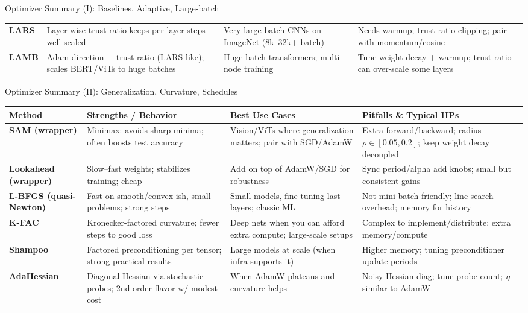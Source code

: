\documentclass{beamer}
\begin{document}
\begin{frame}{Optimizer Summary (I): Baselines, Adaptive, Large-batch}
\begin{tabular}{p{2.8cm} p{4.3cm} p{4.5cm} p{3.5cm}}
\textbf{LARS} &
Layer-wise trust ratio keeps per-layer steps well-scaled &
Very large-batch CNNs on ImageNet (8k–32k+ batch) &
Needs warmup; trust-ratio clipping; pair with momentum/cosine \\

\textbf{LAMB} &
Adam-direction + trust ratio (LARS-like); scales BERT/ViTs to huge batches &
Huge-batch transformers; multi-node training &
Tune weight decay + warmup; trust ratio can over-scale some layers \\
\end{tabular}
\end{frame}

\begin{frame}{Optimizer Summary (II): Generalization, Curvature, Schedules}
\scriptsize
\setlength{\tabcolsep}{3pt}
\renewcommand{\arraystretch}{1.25}
\begin{tabular}{p{2.8cm} p{4.3cm} p{4.5cm} p{3.5cm}}
\textbf{Method} & \textbf{Strengths / Behavior} & \textbf{Best Use Cases} & \textbf{Pitfalls \& Typical HPs} \\
\hline
\textbf{SAM (wrapper)} &
Minimax: avoids sharp minima; often boosts test accuracy &
Vision/ViTs where generalization matters; pair with SGD/AdamW &
Extra forward/backward; radius $\rho\!\in\![0.05,0.2]$; keep weight decay decoupled \\

\textbf{Lookahead (wrapper)} &
Slow–fast weights; stabilizes training; cheap &
Add on top of AdamW/SGD for robustness &
Sync period/alpha add knobs; small but consistent gains \\

\textbf{L-BFGS (quasi-Newton)} &
Fast on smooth/convex-ish, small problems; strong steps &
Small models, fine-tuning last layers; classic ML &
Not mini-batch-friendly; line search overhead; memory for history \\

\textbf{K-FAC} &
Kronecker-factored curvature; fewer steps to good loss &
Deep nets when you can afford extra compute; large-scale setups &
Complex to implement/distribute; extra memory/compute \\

\textbf{Shampoo} &
Factored preconditioning per tensor; strong practical results &
Large models at scale (when infra supports it) &
Higher memory; tuning preconditioner update periods \\

\textbf{AdaHessian} &
Diagonal Hessian via stochastic probes; 2nd-order flavor w/ modest cost &
When AdamW plateaus and curvature helps &
Noisy Hessian diag; tune probe count; $\eta$ similar to AdamW \\


\end{tabular}
\end{frame}
\end{document}
